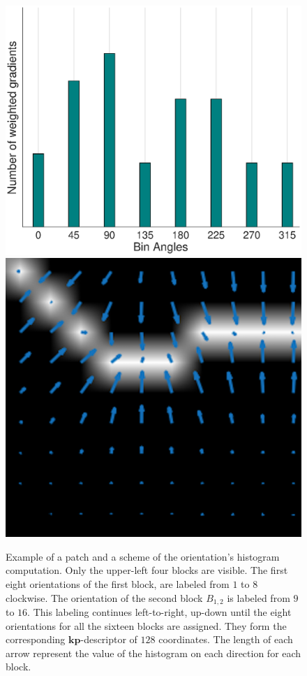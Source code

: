 \documentclass[utf8]{frontiersSCNS} %
\begin{document}
\begin{figure}[h!]
\centering
\includegraphics[width=.49\linewidth]{histogramchart.eps}\label{histogramchart}
\includegraphics[width=.49\linewidth]{samplegradients.png}\label{samplegradients}
\caption{ Example of a patch and a scheme of the orientation's histogram computation. Only the upper-left four blocks are visible.  The first eight orientations of the first block, are labeled from $1$ to $8$ clockwise. The orientation of the second block $ B_{1,2} $ is labeled from $9$ to $16$.  This labeling continues left-to-right, up-down until the eight orientations for all the sixteen blocks are assigned. They form the corresponding $\mathbf{kp}$-descriptor of $128$ coordinates.  The length of each arrow represent the value of the histogram on each direction for each block.}
\label{fig:histogramchart}
\end{figure}
\end{document}
